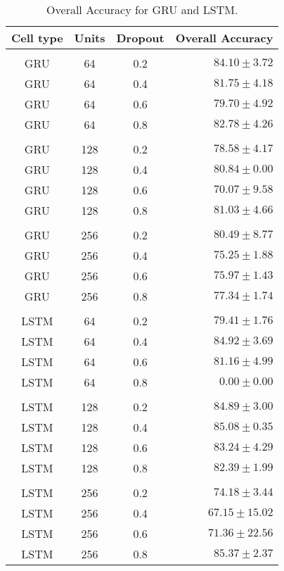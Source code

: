 \begin{table}[H]
  \centering
  \begin{tabular}{cccr} 
      Cell type & Units & Dropout & Overall Accuracy\\[0.2cm] 
      \hline \\[-0.2cm] 
      GRU   &   64  & 0.2 &  $84.10 \pm 3.72$\\
      GRU   &   64  & 0.4 &  $81.75 \pm 4.18$\\
      GRU   &   64  & 0.6 &  $79.70 \pm 4.92$\\
      GRU   &   64  & 0.8 &  $82.78 \pm 4.26$\\[0.05cm] \hline \\[-0.25cm]
      GRU   &   128 & 0.2 &  $78.58 \pm 4.17$\\
      GRU   &   128 & 0.4 &  $80.84 \pm 0.00$\\
      GRU   &   128 & 0.6 &  $70.07 \pm 9.58$\\
      GRU   &   128 & 0.8 &  $81.03 \pm 4.66$\\[0.05cm] \hline \\[-0.25cm]
      GRU   &   256 & 0.2 &  $80.49 \pm 8.77$\\
      GRU   &   256 & 0.4 &  $75.25 \pm 1.88$\\
      GRU   &   256 & 0.6 &  $75.97 \pm 1.43$\\
      GRU   &   256 & 0.8 &  $77.34 \pm 1.74$\\[0.05cm] \hline \\[-0.25cm]
      LSTM  &   64  & 0.2 &  $79.41 \pm 1.76$\\
      LSTM  &   64  & 0.4 &  $84.92 \pm 3.69$\\
      LSTM  &   64  & 0.6 &  $81.16 \pm 4.99$\\
      LSTM  &   64  & 0.8 &  $0.00 \pm 0.00$\\[0.05cm] \hline \\[-0.25cm]
      LSTM  &   128 & 0.2 &  $84.89 \pm 3.00$\\
      LSTM  &   128 & 0.4 &  $85.08 \pm 0.35$\\
      LSTM  &   128 & 0.6 &  $83.24 \pm 4.29$\\
      LSTM  &   128 & 0.8 &  $82.39 \pm 1.99$\\[0.05cm] \hline \\[-0.25cm]
      LSTM  &   256 & 0.2 &  $74.18 \pm 3.44$\\
      LSTM  &   256 & 0.4 &  $67.15 \pm 15.02$\\
      LSTM  &   256 & 0.6 &  $71.36 \pm 22.56$\\
      LSTM  &   256 & 0.8 &  $85.37 \pm 2.37$\\ 
      
  \end{tabular}
  \caption{Overall Accuracy for GRU and LSTM.}
  \label{tab:AJRNNcelltype}
\end{table}

